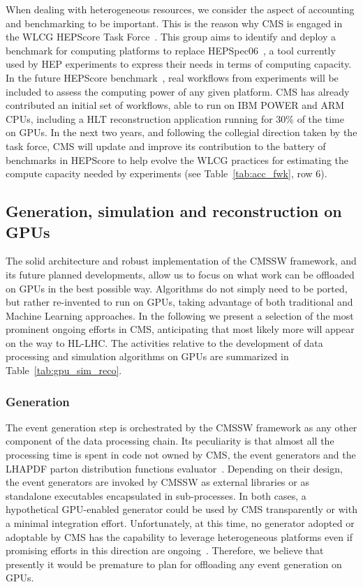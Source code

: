 \documentclass{cmspaper}
\begin{document}
When dealing with heterogeneous resources, we consider the aspect of accounting and benchmarking to be important. This is the reason why CMS is engaged in the WLCG HEPScore Task Force~\cite{hepscoredeployment}. This group aims to identify and deploy a benchmark for computing platforms to replace HEPSpec06~\cite{hepspec06}, a tool currently used by HEP experiments to express their needs in terms of computing capacity. In the future HEPScore benchmark~\cite{HEPSCore}, real workflows from experiments will be included to assess the computing power of any given platform. CMS has already contributed an initial set of workflows, able to run on IBM POWER and ARM CPUs, including a HLT reconstruction application running for 30\% of the time on GPUs. In the next two years, and following the collegial direction taken by the task force, CMS will update and improve its contribution to the battery of benchmarks in HEPScore to help evolve the WLCG practices for estimating the compute capacity needed by experiments (see Table~\ref{tab:acc_fwk}, row 6).

\subsection{Generation, simulation and reconstruction on GPUs}
The solid architecture and robust implementation of the CMSSW framework, and its future planned developments, allow us to focus on what work can be offloaded on GPUs in the best possible way. Algorithms do not simply need to be ported, but rather re-invented to run on GPUs, taking advantage of both traditional and Machine Learning approaches. In the following we present a selection of the most prominent ongoing efforts in CMS, anticipating that most likely more will appear on the way to HL-LHC. The activities relative to the development of data processing and simulation algorithms on GPUs are summarized in Table~\ref{tab:gpu_sim_reco}.

\subsubsection{Generation}
The event generation step is orchestrated by the CMSSW framework as any other component of the data processing chain. Its peculiarity is that almost all the processing time is spent in code not owned by CMS, the event generators and the LHAPDF parton distribution functions evaluator~\cite{Buckley2015}. Depending on their design, the event generators are invoked by CMSSW as external libraries or as standalone executables encapsulated in sub-processes. In both cases, a hypothetical GPU-enabled generator could be used by CMS transparently or with a minimal integration effort. Unfortunately, at this time, no generator adopted or adoptable by CMS has the capability to leverage heterogeneous platforms even if promising efforts in this direction are ongoing~\cite{Hagiwara2013, valassivchep2021, Carrazza:2772403}. Therefore, we believe that presently it would be premature to plan for offloading any event generation on GPUs. 
\end{document}
